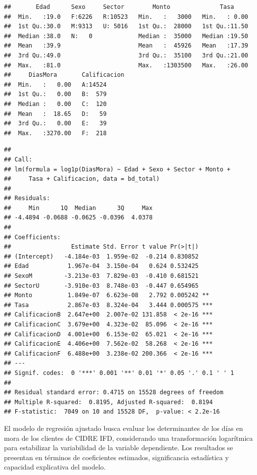 \documentclass[Royal,times,sageh]{sagej}
\begin{document}
\begin{verbatim}
##       Edad      Sexo     Sector        Monto              Tasa      
##  Min.   :19.0   F:6226   R:10523   Min.   :   3000   Min.   : 0.00  
##  1st Qu.:30.0   M:9313   U: 5016   1st Qu.:  28000   1st Qu.:11.50  
##  Median :38.0   N:   0             Median :  35000   Median :19.50  
##  Mean   :39.9                      Mean   :  45926   Mean   :17.39  
##  3rd Qu.:49.0                      3rd Qu.:  35100   3rd Qu.:21.00  
##  Max.   :81.0                      Max.   :1303500   Max.   :26.00  
##     DiasMora       Calificacion
##  Min.   :   0.00   A:14524     
##  1st Qu.:   0.00   B:  579     
##  Median :   0.00   C:  120     
##  Mean   :  18.65   D:   59     
##  3rd Qu.:   0.00   E:   39     
##  Max.   :3270.00   F:  218
\end{verbatim}

\begin{verbatim}
## 
## Call:
## lm(formula = log1p(DiasMora) ~ Edad + Sexo + Sector + Monto + 
##     Tasa + Calificacion, data = bd_total)
## 
## Residuals:
##     Min      1Q  Median      3Q     Max 
## -4.4894 -0.0688 -0.0625 -0.0396  4.0378 
## 
## Coefficients:
##                 Estimate Std. Error t value Pr(>|t|)    
## (Intercept)   -4.184e-03  1.959e-02  -0.214 0.830852    
## Edad           1.967e-04  3.150e-04   0.624 0.532425    
## SexoM         -3.213e-03  7.829e-03  -0.410 0.681521    
## SectorU       -3.910e-03  8.748e-03  -0.447 0.654965    
## Monto          1.849e-07  6.623e-08   2.792 0.005242 ** 
## Tasa           2.867e-03  8.324e-04   3.444 0.000575 ***
## CalificacionB  2.647e+00  2.007e-02 131.858  < 2e-16 ***
## CalificacionC  3.679e+00  4.323e-02  85.096  < 2e-16 ***
## CalificacionD  4.001e+00  6.153e-02  65.021  < 2e-16 ***
## CalificacionE  4.406e+00  7.562e-02  58.268  < 2e-16 ***
## CalificacionF  6.488e+00  3.238e-02 200.366  < 2e-16 ***
## ---
## Signif. codes:  0 '***' 0.001 '**' 0.01 '*' 0.05 '.' 0.1 ' ' 1
## 
## Residual standard error: 0.4715 on 15528 degrees of freedom
## Multiple R-squared:  0.8195, Adjusted R-squared:  0.8194 
## F-statistic:  7049 on 10 and 15528 DF,  p-value: < 2.2e-16
\end{verbatim}

El modelo de regresión ajustado busca evaluar los determinantes de los
días en mora de los clientes de CIDRE IFD, considerando una
transformación logarítmica para estabilizar la variabilidad de la
variable dependiente. Los resultados se presentan en términos de
coeficientes estimados, significancia estadística y capacidad
explicativa del modelo.
\end{document}
